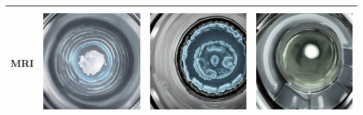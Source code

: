 \begin{table}[H]
\begin{tabularx}{\linewidth}{@{}>{\centering\arraybackslash}m{3cm}>{\centering\arraybackslash}X>{\centering\arraybackslash}X>{\centering\arraybackslash}X@{}}
MRI & \includegraphics[valign=M,width=\linewidth,height=4cm,keepaspectratio]{main/content/images/prior_concepts_sd/v2/mri/mri-1.jpg} & \includegraphics[valign=M,width=\linewidth,height=4cm,keepaspectratio]{main/content/images/prior_concepts_sd/v2/mri/mri-2.jpg} & \includegraphics[valign=M,width=\linewidth,height=4cm,keepaspectratio]{main/content/images/prior_concepts_sd/v2/mri/mri-3.jpg} \\
\midrule

\end{tabularx}
\end{table}
